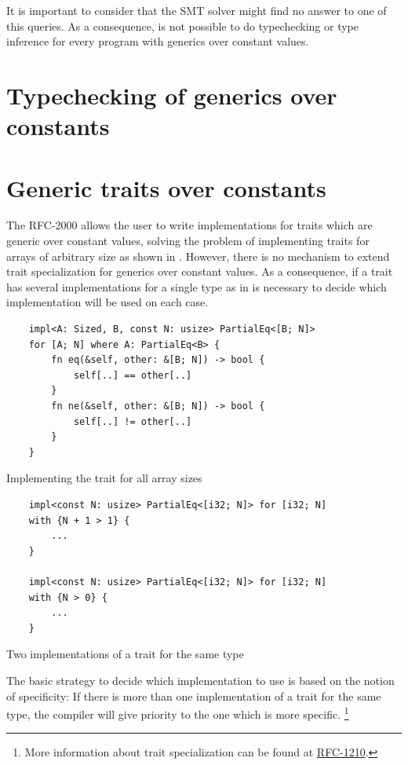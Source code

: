 It is important to consider that the SMT solver might find no answer to one of
this queries. As a consequence, is not possible to do typechecking or type
inference for every program with generics over constant values.

\section{Typechecking of generics over constants}

\section{Generic traits over constants}

The RFC-2000 allows the user to write implementations for traits which are
generic over constant values, solving the problem of implementing traits for
arrays of arbitrary size as shown in . However,
there is no mechanism to extend trait specialization for generics over constant
values. As a consequence, if a trait has several implementations for a single
type as in  is necessary to decide which
implementation will be used on each case. 

\begin{listing}[h]
	\begin{verbatim}
    impl<A: Sized, B, const N: usize> PartialEq<[B; N]> 
    for [A; N] where A: PartialEq<B> {
        fn eq(&self, other: &[B; N]) -> bool {
            self[..] == other[..]
        }
        fn ne(&self, other: &[B; N]) -> bool {
            self[..] != other[..]
        }
    }
	\end{verbatim}
    \caption{Implementing the  trait for all array sizes}
  \label{lst:trait_const_generics}
\end{listing}

\begin{listing}[h]
	\begin{verbatim}
    impl<const N: usize> PartialEq<[i32; N]> for [i32; N]
    with {N + 1 > 1} {
        ...
    }
   
    impl<const N: usize> PartialEq<[i32; N]> for [i32; N]
    with {N > 0} {
        ...
    }
	\end{verbatim}
    \caption{Two implementations of a trait for the same type}
  \label{lst:trait_const_generics_spec}
\end{listing}

The basic strategy to decide which implementation to use is based on the notion
of specificity: If there is more than one implementation of a trait for the
same type, the compiler will give priority to the one which is more specific.
\footnote{More information about trait specialization can be found at
\href{https://github.com/rust-lang/rfcs/blob/master/text/1210-impl-specialization.md}{RFC-1210}.}


